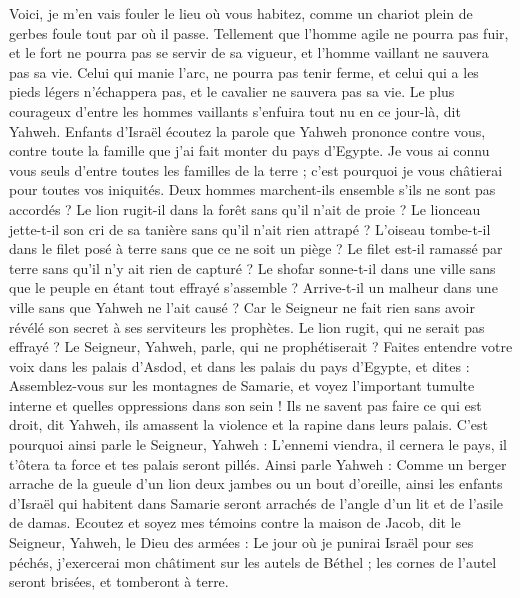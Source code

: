 \begin{multicols}{2}
Voici, je m’en vais fouler le lieu où vous habitez, comme un chariot plein de gerbes foule tout par où il passe.
Tellement que l’homme agile ne pourra pas fuir, et le fort ne pourra pas se servir de sa vigueur, et l’homme vaillant ne sauvera pas sa vie.
Celui qui manie l'arc, ne pourra pas tenir ferme, et celui qui a les pieds légers n'échappera pas, et le cavalier ne sauvera pas sa vie.
Le plus courageux d’entre les hommes vaillants s'enfuira tout nu en ce jour-là, dit Yahweh.
\VerseOne{}Enfants d’Israël écoutez la parole que Yahweh prononce contre vous, contre toute la famille que j'ai fait monter du pays d'Egypte.
Je vous ai connu vous seuls d'entre toutes les familles de la terre ; c'est pourquoi je vous châtierai pour toutes vos iniquités.
Deux hommes marchent-ils ensemble s’ils ne sont pas accordés ?
Le lion rugit-il dans la forêt sans qu’il n'ait de proie ? Le lionceau jette-t-il son cri de sa tanière sans qu’il n'ait rien attrapé ?
L'oiseau tombe-t-il dans le filet posé à terre sans que ce ne soit un piège ? Le filet est-il ramassé par terre sans qu’il n’y ait rien de capturé ?
Le shofar sonne-t-il dans une ville sans que le peuple en étant tout effrayé s’assemble ? Arrive-t-il un malheur dans une ville sans que Yahweh ne l’ait causé ?
Car le Seigneur ne fait rien sans avoir révélé son secret à ses serviteurs les prophètes.
Le lion rugit, qui ne serait pas effrayé ? Le Seigneur, Yahweh, parle, qui ne prophétiserait ?
Faites entendre votre voix dans les palais d'Asdod, et dans les palais du pays d'Egypte, et dites : Assemblez-vous sur les montagnes de Samarie, et voyez l’important tumulte interne et quelles oppressions dans son sein !
Ils ne savent pas faire ce qui est droit, dit Yahweh, ils amassent la violence et la rapine dans leurs palais.
C'est pourquoi ainsi parle le Seigneur, Yahweh : L'ennemi viendra, il cernera le pays, il t'ôtera ta force et tes palais seront pillés.
Ainsi parle Yahweh : Comme un berger arrache de la gueule d'un lion deux jambes ou un bout d'oreille, ainsi les enfants d'Israël qui habitent dans Samarie seront arrachés de l’angle d’un lit et de l’asile de damas.
Ecoutez et soyez mes témoins contre la maison de Jacob, dit le Seigneur, Yahweh, le Dieu des armées :
Le jour où je punirai Israël pour ses péchés, j’exercerai mon châtiment sur les autels de Béthel ; les cornes de l'autel seront brisées, et tomberont à terre.

\end{multicols}
